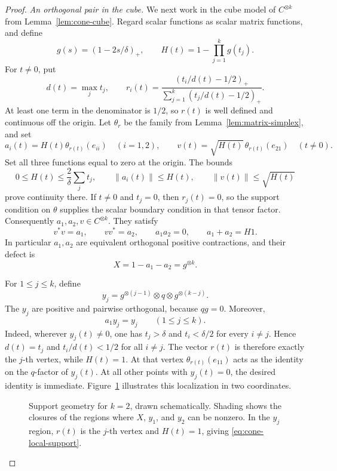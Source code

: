 \begin{proof}
\emph{An orthogonal pair in the cube.}
We next work in the cube model of \(C^{\otimes k}\) from
Lemma~\ref{lem:cone-cube}. Regard scalar functions as scalar matrix
functions, and define
\[
g(s)=(1-2s/\delta)_+,\qquad
H(t)=1-\prod_{j=1}^k g(t_j).
\]
For \(t\ne0\), put
\[
d(t)=\max_j t_j,\qquad
r_i(t)=
\frac{(t_i/d(t)-1/2)_+}
{\sum_{j=1}^k(t_j/d(t)-1/2)_+}.
\]
At least one term in the denominator is \(1/2\), so \(r(t)\) is
well defined and continuous off the origin. Let \(\theta_r\) be the
family from Lemma~\ref{lem:matrix-simplex}, and set
\[
a_i(t)=H(t)\theta_{r(t)}(e_{ii})\quad(i=1,2),\qquad
v(t)=\sqrt{H(t)}\,\theta_{r(t)}(e_{21})
\quad(t\ne0).
\]
Set all three functions equal to zero at the origin.
The bounds
\[
0\le H(t)\le\frac{2}{\delta}\sum_j t_j,\qquad
\|a_i(t)\|\le H(t),\qquad
\|v(t)\|\le\sqrt{H(t)}
\]
prove continuity there. If \(t\ne0\) and \(t_j=0\), then \(r_j(t)=0\), so the
support condition on \(\theta\) supplies the scalar boundary condition
in that tensor factor. Consequently \(a_1,a_2,v\in C^{\otimes k}\).
They satisfy
\begin{equation}\label{eq:cone-positive-pair}
v^*v=a_1,\qquad vv^*=a_2,\qquad a_1a_2=0,\qquad
a_1+a_2=H1.
\end{equation}
In particular \(a_1,a_2\) are equivalent orthogonal positive
contractions, and their defect is
\[
X=1-a_1-a_2=g^{\otimes k}.
\]

For \(1\le j\le k\), define
\[
y_j=g^{\otimes(j-1)}\otimes q\otimes g^{\otimes(k-j)}.
\]
The \(y_j\) are positive and pairwise orthogonal, because \(qg=0\).
Moreover,
\begin{equation}\label{eq:cone-local-support}
a_1y_j=y_j\qquad(1\le j\le k).
\end{equation}
Indeed, wherever \(y_j(t)\ne0\), one has \(t_j>\delta\) and
\(t_i<\delta/2\) for every \(i\ne j\). Hence \(d(t)=t_j\) and
\(t_i/d(t)<1/2\) for all \(i\ne j\). The vector \(r(t)\) is therefore
exactly the \(j\)-th vertex, while \(H(t)=1\).
At that vertex \(\theta_{r(t)}(e_{11})\) acts as the identity on
the \(q\)-factor of \(y_j(t)\). At all other points with \(y_j(t)=0\),
the desired identity is immediate.
Figure~\ref{fig:cone-support} illustrates this localization in two
coordinates.

\begin{figure}[tbp]
\centering

\caption{Support geometry for \(k=2\), drawn schematically. Shading
shows the closures of the regions where \(X\), \(y_1\), and \(y_2\)
can be nonzero. In the \(y_j\) region, \(r(t)\) is the \(j\)-th vertex
and \(H(t)=1\), giving \eqref{eq:cone-local-support}.}
\label{fig:cone-support}
\end{figure}


\end{proof}
